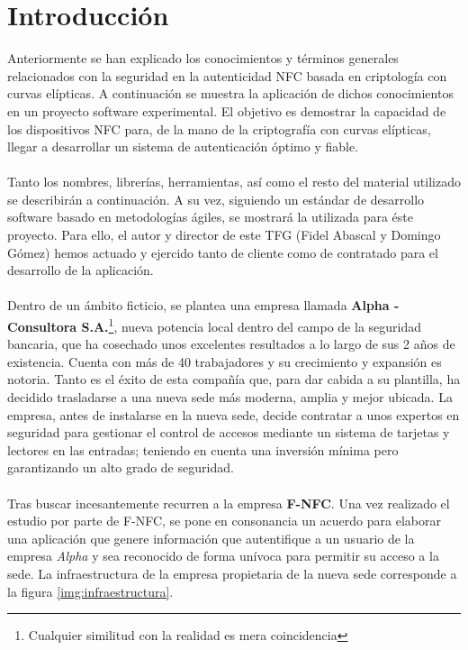 \documentclass[../PFC.tex]{subfiles}
\begin{document}
\section{Introducción}
\label{App:Introducción}

Anteriormente se han explicado los conocimientos y términos generales relacionados con la seguridad en la autenticidad NFC basada en criptología con curvas elípticas. A continuación se muestra la aplicación de dichos conocimientos en un proyecto software experimental. El objetivo es demostrar la capacidad de los dispositivos NFC para, de la mano de la criptografía con curvas elípticas, llegar a desarrollar un sistema de autenticación óptimo y fiable.
\\\\
Tanto los nombres, librerías, herramientas, así como el resto del material utilizado se describirán a continuación. A su vez, siguiendo un estándar de desarrollo software basado en metodologías ágiles, se mostrará la utilizada para éste proyecto. Para ello,  el autor y director de este TFG (Fidel Abascal y Domingo Gómez) hemos actuado y ejercido tanto de cliente como de contratado para el desarrollo de la aplicación. 
\\\\
Dentro de un ámbito ficticio, se plantea una empresa llamada \textbf{Alpha - Consultora S.A.}\footnote{Cualquier similitud con la realidad es mera coincidencia}, nueva potencia local dentro del campo de la seguridad bancaria, que ha cosechado unos excelentes resultados a lo largo de sus 2 años de existencia. Cuenta con más de 40 trabajadores y su crecimiento y expansión es notoria. Tanto es el éxito de esta compañía que, para dar cabida a su plantilla, ha decidido trasladarse a una nueva sede más moderna, amplia y mejor ubicada. La empresa, antes de instalarse en la nueva sede, decide contratar a unos expertos en seguridad para gestionar el control de accesos mediante un sistema de tarjetas y lectores en las entradas; teniendo en cuenta una inversión mínima pero garantizando un alto grado de seguridad.
\\\\
Tras buscar incesantemente recurren a la empresa \textbf{F-NFC}. Una vez realizado el estudio por parte de F-NFC, se pone en consonancia un acuerdo para elaborar una aplicación que genere información que autentifique a un usuario de la empresa \textit{Alpha} y sea reconocido de forma unívoca para permitir su acceso a la sede. La infraestructura de la empresa propietaria de la nueva sede corresponde a la figura \ref{img:infraestructura}.
\end{document}
